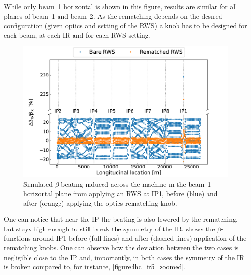 While only beam~\num{1} horizontal is shown in this figure, results are similar for all planes of beam~\num{1} and beam~\num{2}.
As the rematching depends on the desired configuration (given optics and setting of the RWS) a knob has to be designed for each beam, at each IR and for each RWS setting.

\begin{figure}[!htb]
    \centering
    \includegraphics[width=\textwidth]{Figures/IR_Coupling_Correction/rws_ir1_b1_bbeating_rematched.pdf}
    \caption{Simulated \(\beta\)-beating induced across the machine in the beam~\num{1} horizontal plane from applying an RWS at IP\num{1}, before (\textcolor{mplblue}{blue}) and after (\textcolor{mplorange}{orange}) applying the optics rematching knob.}
    \label{figure:rws_rematching_efficiency}
\end{figure}

One can notice that near the IP the beating is also lowered by the rematching, but stays high enough to still break the symmetry of the IR.
 shows the \(\beta\)-functions around IP\num{1} before (full lines) and after (dashed lines) application of the rematching knobs.
One can observe how the deviation between the two cases is negligible close to the IP and, importantly, in both cases the symmetry of the IR is broken compared to, for instance, \cref{figure:lhc_ir5_zoomed}.

